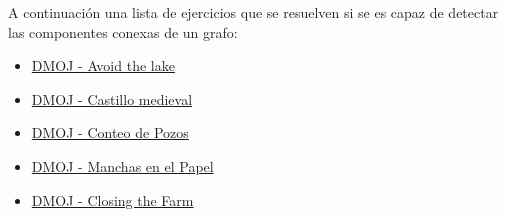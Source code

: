 A continuación una lista de ejercicios que se resuelven si se es capaz de detectar las componentes conexas de un grafo:

\begin{itemize}
	\item \href{https://dmoj.uclv.edu.cu/problem/avoidlake}{DMOJ - Avoid the lake}
	\item \href{https://dmoj.uclv.edu.cu/problem/castle}{DMOJ - Castillo medieval}
	\item \href{https://dmoj.uclv.edu.cu/problem/lkcount}{DMOJ - Conteo de Pozos}
	\item \href{https://dmoj.uclv.edu.cu/problem/blots}{DMOJ - Manchas en el Papel}
	\item \href{https://dmoj.uclv.edu.cu/problem/closing}{DMOJ - Closing the Farm}
\end{itemize}